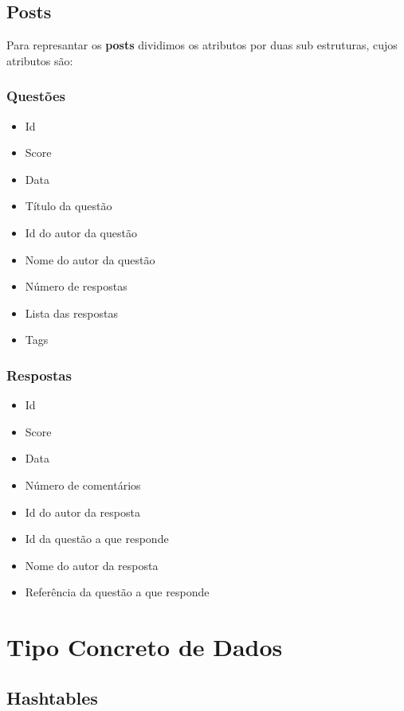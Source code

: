 \documentclass[10pt,a4paper]{report}
\begin{document}
    \section{Posts}
    Para represantar os \textbf{posts} dividimos os atributos por duas
     sub estruturas, cujos atributos são:
        \subsection{Questões}
        \begin{itemize}
            \item Id
            \item Score
            \item Data
            \item Título da questão
            \item Id do autor da questão
            \item Nome do autor da questão
            \item Número de respostas
            \item Lista das respostas
            \item Tags
        \end{itemize}
        
        \subsection{Respostas}
        \begin{itemize}
            \item Id
            \item Score
            \item Data
            \item Número de comentários
            \item Id do autor da resposta
            \item Id da questão a que responde
            \item Nome do autor da resposta
            \item Referência da questão a que responde
        \end{itemize}


\chapter{Tipo Concreto de Dados}

    \section{Hashtables}
\end{document}
